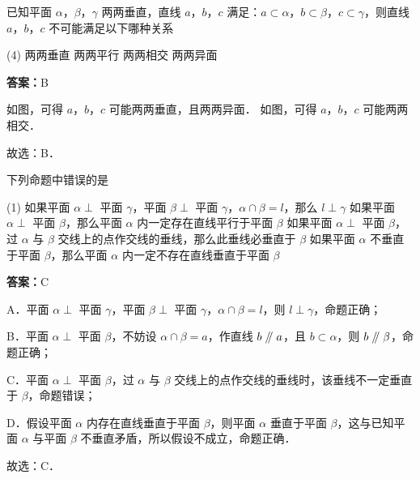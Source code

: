 \vspace{2em}


\begin{example}[\bkstar{3}{5}]
已知平面 $\alpha$，$\beta$，$\gamma$ 两两垂直，直线 $a$，$b$，$c$ 满足：$a\subset\alpha$，$b\subset\beta$，$c\subset\gamma$，则直线 $a$，$b$，$c$ 不可能满足以下哪种关系
\begin{tasks}(4)
    \task 两两垂直
    \task 两两平行
    \task 两两相交
    \task 两两异面
\end{tasks}
\end{example}
\begin{solution}
\textbf{答案：}B

如图，可得 $a$，$b$，$c$ 可能两两垂直，且两两异面．
如图，可得 $a$，$b$，$c$ 可能两两相交．

故选：B．
\end{solution}

\vspace{2em}

\begin{example}[\bkstar{3}{5}]
下列命题中错误的是
\begin{tasks}(1)
    \task 如果平面 $\alpha\perp$ 平面 $\gamma$，平面 $\beta\perp$ 平面 $\gamma$，$\alpha\cap\beta=l$，那么 $l\perp\gamma$
    \task 如果平面 $\alpha\perp$ 平面 $\beta$，那么平面 $\alpha$ 内一定存在直线平行于平面 $\beta$
    \task 如果平面 $\alpha\perp$ 平面 $\beta$，过 $\alpha$ 与 $\beta$ 交线上的点作交线的垂线，那么此垂线必垂直于 $\beta$
    \task 如果平面 $\alpha$ 不垂直于平面 $\beta$，那么平面 $\alpha$ 内一定不存在直线垂直于平面 $\beta$
\end{tasks}
\end{example}
\begin{solution}
\textbf{答案：}C

A．平面 $\alpha\perp$ 平面 $\gamma$，平面 $\beta\perp$ 平面 $\gamma$，$\alpha\cap\beta=l$，则 $l\perp\gamma$，命题正确；

B．平面 $\alpha\perp$ 平面 $\beta$，不妨设 $\alpha\cap\beta=a$，作直线 $b\mathrel{/\mkern-5mu/} a$，且 $b\subset\alpha$，则 $b\mathrel{/\mkern-5mu/}\beta$，命题正确；

C．平面 $\alpha\perp$ 平面 $\beta$，过 $\alpha$ 与 $\beta$ 交线上的点作交线的垂线时，该垂线不一定垂直于 $\beta$，命题错误；

D．假设平面 $\alpha$ 内存在直线垂直于平面 $\beta$，则平面 $\alpha$ 垂直于平面 $\beta$，这与已知平面 $\alpha$ 与平面 $\beta$ 不垂直矛盾，所以假设不成立，命题正确．

故选：C．
\end{solution}

